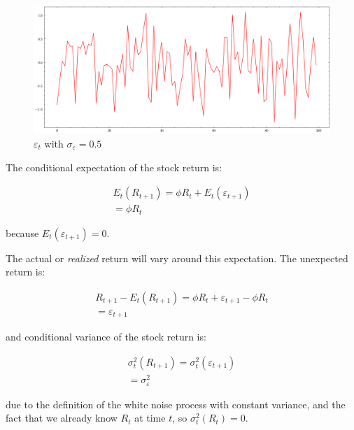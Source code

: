 \begin{figure}[htbp]
    \centering
    \includegraphics[width=1\textwidth]{../images/chapter01/unexpected_shocks.png}
    \caption{$\varepsilon_t$ with $\sigma_{\varepsilon} = 0.5$}
    \label{fig:fig01}
\end{figure}


The conditional expectation of the stock return is:

\begin{equation}
    \begin{aligned}
    E_t(R_{t+1}) = \phi R_t + E_t(\varepsilon_{t+1}) \\
    = \phi R_t
    \end{aligned}
\end{equation}

because $E_t(\varepsilon_{t+1}) = 0$.

The actual or \textit{realized} return will vary 
around this expectation. The unexpected return is:

\begin{equation}
    \begin{aligned}
    R_{t+1} - E_t(R_{t+1}) = \phi R_t + \varepsilon_{t+1} - \phi R_t \\
    = \varepsilon_{t+1}
    \end{aligned}
\end{equation}

and conditional variance of the stock return is:

\begin{equation}
    \begin{aligned}
    \sigma_t^2(R_{t+1}) = \sigma^2_t(\varepsilon_{t+1}) \\
    = \sigma_{\varepsilon}^2
    \end{aligned}
\end{equation}

due to the definition of the white noise 
process with constant variance, and the fact that
we already know $R_t$ at time $t$, so 
$\sigma_t^2(R_{t}) = 0$.

